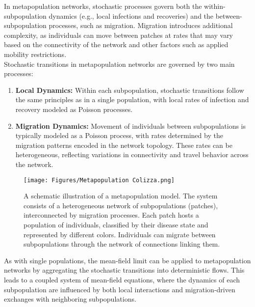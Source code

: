 In metapopulation networks, stochastic processes govern both the within-subpopulation dynamics (e.g., local infections and recoveries) and the between-subpopulation processes, such as migration. Migration introduces additional complexity, as individuals can move between patches at rates that may vary based on the connectivity of the network and other factors such as applied mobility restrictions.\\

Stochastic transitions in metapopulation networks are governed by two main processes:


\begin{enumerate}
    \item \textbf{Local Dynamics:} Within each subpopulation, stochastic transitions follow the same principles as in a single population, with local rates of infection and recovery modeled as Poisson processes.
    \item \textbf{Migration Dynamics:} Movement of individuals between subpopulations is typically modeled as a Poisson process, with rates determined by the migration patterns encoded in the network topology. These rates can be heterogeneous, reflecting variations in connectivity and travel behavior across the network.\cite{colizza2008epidemic}
\end{enumerate}

\begin{figure}
    \centering
    \texttt{[image: Figures/Metapopulation Colizza.png]}
    \caption{\small A schematic illustration of a metapopulation model. The system consists of a heterogeneous network of subpopulations (patches), interconnected by migration processes. Each patch hosts a population of individuals, classified by their disease state and represented by different colors. Individuals can migrate between subpopulations through the network of connections linking them. \cite{colizza2007reaction}}
\end{figure}

As with single populations, the mean-field limit can be applied to metapopulation networks by aggregating the stochastic transitions into deterministic flows. This leads to a coupled system of mean-field equations, where the dynamics of each subpopulation are influenced by both local interactions and migration-driven exchanges with neighboring subpopulations.\\

